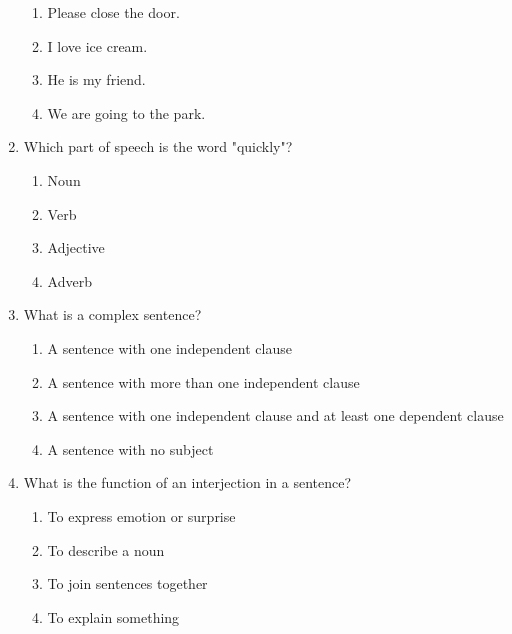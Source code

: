 \documentclass[12pt]{article}
\begin{document}
\begin{enumerate}
    \begin{enumerate}[label=\Alph*.]
        \item Please close the door.
        \item I love ice cream.
        \item He is my friend.
        \item We are going to the park.
    \end{enumerate}

    \vspace{0.5cm}

    \item Which part of speech is the word "quickly"?

    \begin{enumerate}[label=\Alph*.]
        \item Noun
        \item Verb
        \item Adjective
        \item Adverb
    \end{enumerate}

    \vspace{0.5cm}

    \item What is a complex sentence?

    \begin{enumerate}[label=\Alph*.]
        \item A sentence with one independent clause
        \item A sentence with more than one independent clause
        \item A sentence with one independent clause and at least one dependent clause
        \item A sentence with no subject
    \end{enumerate}

    \vspace{0.5cm}

    \item What is the function of an interjection in a sentence?

    \begin{enumerate}[label=\Alph*.]
        \item To express emotion or surprise
        \item To describe a noun
        \item To join sentences together
        \item To explain something
    \end{enumerate}


\end{enumerate}
\end{document}
